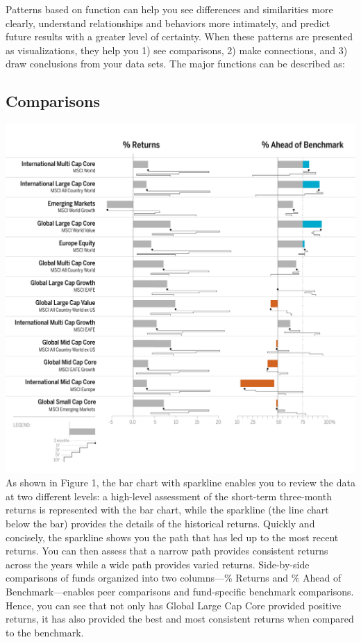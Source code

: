 \documentclass[]{book}
\theoremstyle{definition}
\theoremstyle{definition}
\theoremstyle{definition}
\theoremstyle{remark}
\begin{document}
Patterns based on function can help you see differences and similarities
more clearly, understand relationships and behaviors more intimately,
and predict future results with a greater level of certainty. When these
patterns are presented as visualizations, they help you 1) see
comparisons, 2) make connections, and 3) draw conclusions from your data
sets. The major functions can be described as:

\subsection{Comparisons}\label{comparisons}

\includegraphics{images/patten-1.jpg} As shown in Figure 1, the bar
chart with sparkline enables you to review the data at two different
levels: a high-level assessment of the short-term three-month returns is
represented with the bar chart, while the sparkline (the line chart
below the bar) provides the details of the historical returns. Quickly
and concisely, the sparkline shows you the path that has led up to the
most recent returns. You can then assess that a narrow path provides
consistent returns across the years while a wide path provides varied
returns. Side-by-side comparisons of funds organized into two
columns---\% Returns and \% Ahead of Benchmark---enables peer
comparisons and fund-specific benchmark comparisons. Hence, you can see
that not only has Global Large Cap Core provided positive returns, it
has also provided the best and most consistent returns when compared to
the benchmark.
\end{document}
